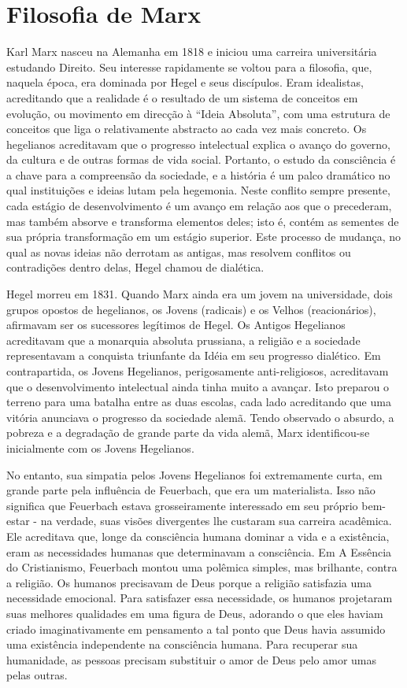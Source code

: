 \section{Filosofia de Marx}
 \par 
Karl Marx nasceu na Alemanha em 1818 e iniciou uma carreira universitária estudando Direito. Seu interesse rapidamente se voltou para a filosofia, que, naquela época, era dominada por Hegel e seus discípulos. Eram idealistas, acreditando que a realidade é o resultado de um sistema de conceitos em evolução, ou movimento em direcção à “Ideia Absoluta”, com uma estrutura de conceitos que liga o relativamente abstracto ao cada vez mais concreto. Os hegelianos acreditavam que o progresso intelectual explica o avanço do governo, da cultura e de outras formas de vida social. Portanto, o estudo da consciência é a chave para a compreensão da sociedade, e a história é um palco dramático no qual instituições e ideias lutam pela hegemonia. Neste conflito sempre presente, cada estágio de desenvolvimento é um avanço em relação aos que o precederam, mas também absorve e transforma elementos deles; isto é, contém as sementes de sua própria transformação em um estágio superior. Este processo de mudança, no qual as novas ideias não derrotam as antigas, mas resolvem conflitos ou contradições dentro delas, Hegel chamou de dialética.
 \par 
Hegel morreu em 1831. Quando Marx ainda era um jovem na universidade, dois grupos opostos de hegelianos, os Jovens (radicais) e os Velhos (reacionários), afirmavam ser os sucessores legítimos de Hegel. Os Antigos Hegelianos acreditavam que a monarquia absoluta prussiana, a religião e a sociedade representavam a conquista triunfante da Idéia em seu progresso dialético. Em contrapartida, os Jovens Hegelianos, perigosamente anti-religiosos, acreditavam que o desenvolvimento intelectual ainda tinha muito a avançar. Isto preparou o terreno para uma batalha entre as duas escolas, cada lado acreditando que uma vitória anunciava o progresso da sociedade alemã. Tendo observado o absurdo, a pobreza e a degradação de grande parte da vida alemã, Marx identificou-se inicialmente com os Jovens Hegelianos.
 \par 
No entanto, sua simpatia pelos Jovens Hegelianos foi extremamente curta, em grande parte pela influência de Feuerbach, que era um materialista. Isso não significa que Feuerbach estava grosseiramente interessado em seu próprio bem-estar - na verdade, suas visões divergentes lhe custaram sua carreira acadêmica. Ele acreditava que, longe da consciência humana dominar a vida e a existência, eram as necessidades humanas que determinavam a consciência. Em A Essência do Cristianismo, Feuerbach montou uma polêmica simples, mas brilhante, contra a religião. Os humanos precisavam de Deus porque a religião satisfazia uma necessidade emocional. Para satisfazer essa necessidade, os humanos projetaram suas melhores qualidades em uma figura de Deus, adorando o que eles haviam criado imaginativamente em pensamento a tal ponto que Deus havia assumido uma existência independente na consciência humana. Para recuperar sua humanidade, as pessoas precisam substituir o amor de Deus pelo amor umas pelas outras.
